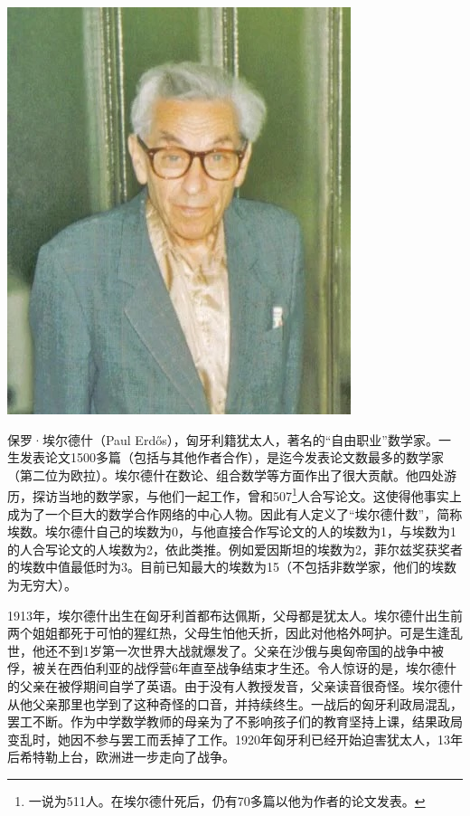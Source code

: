 \documentclass[b5paper]{ctexart}
\begin{document}
\begin{mdframed}

\begin{center}
 \includegraphics[scale=0.3]{img/erdos-1992}
 \label{fig:erdos-1992}
\end{center}

保罗·埃尔德什（Paul Erdős），匈牙利籍犹太人，著名的“自由职业”数学家。一生发表论文1500多篇（包括与其他作者合作），是迄今发表论文数最多的数学家（第二位为欧拉）。埃尔德什在数论、组合数学等方面作出了很大贡献\cite{Hoffman-Paul-2025}。他四处游历，探访当地的数学家，与他们一起工作，曾和507\footnote{一说为511人。在埃尔德什死后，仍有70多篇以他为作者的论文发表。}人合写论文。这使得他事实上成为了一个巨大的数学合作网络的中心人物。因此有人定义了“埃尔德什数”，简称埃数。埃尔德什自己的埃数为0，与他直接合作写论文的人的埃数为1，与埃数为1的人合写论文的人埃数为2，依此类推。例如爱因斯坦的埃数为2，菲尔兹奖获奖者的埃数中值最低时为3。目前已知最大的埃数为15（不包括非数学家，他们的埃数为无穷大）。


1913年，埃尔德什出生在匈牙利首都布达佩斯，父母都是犹太人。埃尔德什出生前两个姐姐都死于可怕的猩红热，父母生怕他夭折，因此对他格外呵护。可是生逢乱世，他还不到1岁第一次世界大战就爆发了。父亲在沙俄与奥匈帝国的战争中被俘，被关在西伯利亚的战俘营6年直至战争结束才生还。令人惊讶的是，埃尔德什的父亲在被俘期间自学了英语。由于没有人教授发音，父亲读音很奇怪。埃尔德什从他父亲那里也学到了这种奇怪的口音，并持续终生。一战后的匈牙利政局混乱，罢工不断。作为中学数学教师的母亲为了不影响孩子们的教育坚持上课，结果政局变乱时，她因不参与罢工而丢掉了工作。1920年匈牙利已经开始迫害犹太人，13年后希特勒上台，欧洲进一步走向了战争。


\end{mdframed}
\end{document}
